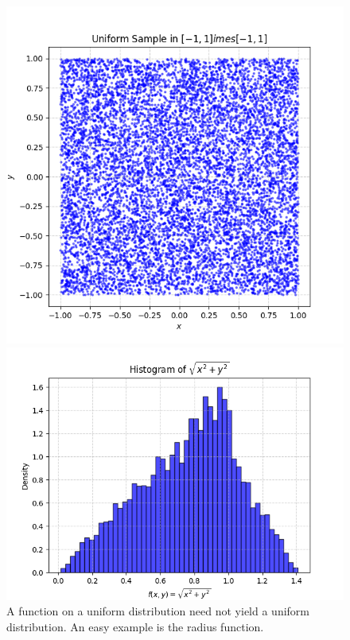  \begin{figure}[H]
                 \centering
                 \begin{minipage}{.4\textwidth}
    \centering
    \includegraphics[width=\textwidth]{tex/ims/unixy.png}
    \end{minipage}
    \begin{minipage}{.4\textwidth}
    \centering
    \includegraphics[width=\textwidth]{tex/ims/unirad.png}
    
    \end{minipage}
     \caption{A function on a uniform distribution need not yield a uniform distribution. An easy example is the radius function.}
             \end{figure}

